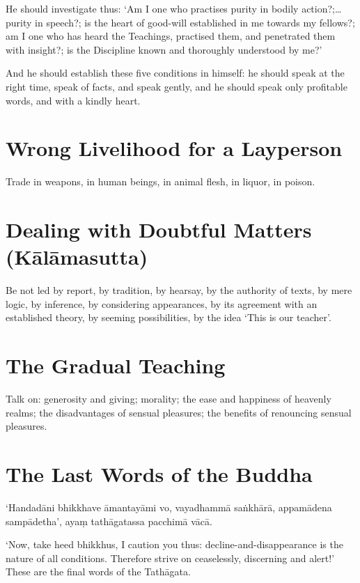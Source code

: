 He should investigate thus: ‘Am I one who practises purity in bodily action?;…
purity in speech?; is the heart of good-will established in me towards my
fellows?; am I one who has heard the Teachings, practised them, and penetrated
them with insight?; is the Discipline known and thoroughly understood by me?’

And he should establish these five conditions in himself: he should speak at the
right time, speak of facts, and speak gently, and he should speak only
profitable words, and with a kindly heart.


\section{Wrong Livelihood for a Layperson}

Trade in weapons, in human beings, in animal flesh, in liquor, in poison.


\section{Dealing with Doubtful Matters (Kālāmasutta)}

Be not led by report, by tradition, by hearsay, by the authority of texts, by
mere logic, by inference, by considering appearances, by its agreement with an
established theory, by seeming possibilities, by the idea ‘This is our teacher’.


\section{The Gradual Teaching}

Talk on: generosity and giving; morality; the ease and happiness of heavenly
realms; the disadvantages of sensual pleasures; the benefits of renouncing
sensual pleasures.


\section{The Last Words of the Buddha}

‘Handadāni bhikkhave āmantayāmi vo, vayadhammā saṅkhārā, appamādena sampādetha’,
ayaṃ tathāgatassa pacchimā vācā.

‘Now, take heed bhikkhus, I caution you thus: decline-and-disappearance is the
nature of all conditions. Therefore strive on ceaselessly, discerning and
alert!’ These are the final words of the Tathāgata.

